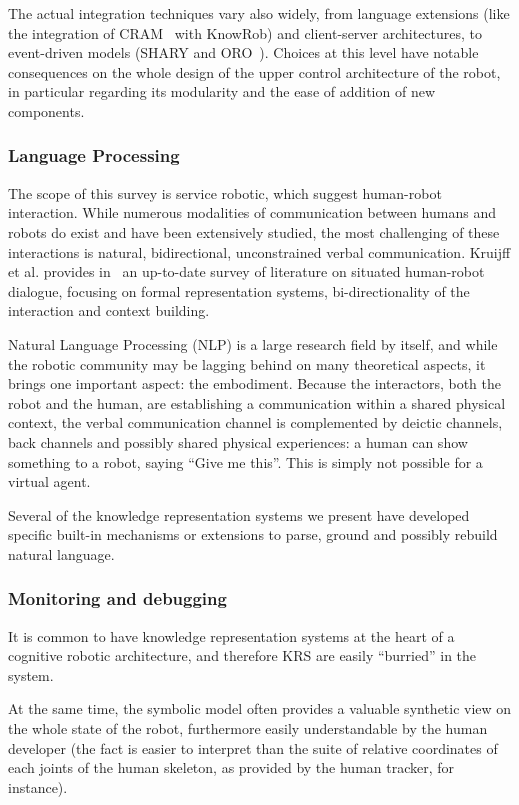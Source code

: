 The actual integration techniques vary also widely, from language extensions
(like the integration of CRAM~\cite{Beetz2010} with KnowRob) and client-server
architectures, to event-driven models (SHARY and ORO~\cite{Alami2011}). Choices
at this level have notable consequences on the whole design of the upper
control architecture of the robot, in particular regarding its modularity and
the ease of addition of new components.

\subsubsection{Language Processing}
\label{sect|nlp}

The scope of this survey is service robotic, which suggest human-robot
interaction. While numerous modalities of communication between humans and
robots do exist and have been extensively studied, the most challenging of
these interactions is natural, bidirectional, unconstrained verbal
communication. Kruijff et al. provides in~\cite{Kruijff2010} an up-to-date
survey of literature on situated human-robot dialogue, focusing on formal
representation systems, bi-directionality of the interaction and context
building.

Natural Language Processing (NLP) is a large research field by itself, and
while the robotic community may be lagging behind on many theoretical aspects,
it brings one important aspect: the embodiment. Because the interactors, both
the robot and the human, are establishing a communication within a shared
physical context, the verbal communication channel is complemented by deictic
channels, back channels and possibly shared physical experiences: a human can
show something to a robot, saying ``Give me this''. This is simply not possible
for a virtual agent.

Several of the knowledge representation systems we present have developed
specific built-in mechanisms or extensions to parse, ground and possibly
rebuild natural language.

\subsubsection{Monitoring and debugging}
\label{sect|debugging}

It is common to have knowledge representation systems at the heart of a
cognitive robotic architecture, and therefore KRS are easily ``burried'' in the
system.

At the same time, the symbolic model often provides a valuable synthetic view
on the whole state of the robot, furthermore easily understandable by the human
developer (the fact  is easier to interpret than
the suite of relative coordinates of each joints of the human skeleton, as
provided by the human tracker, for instance).

